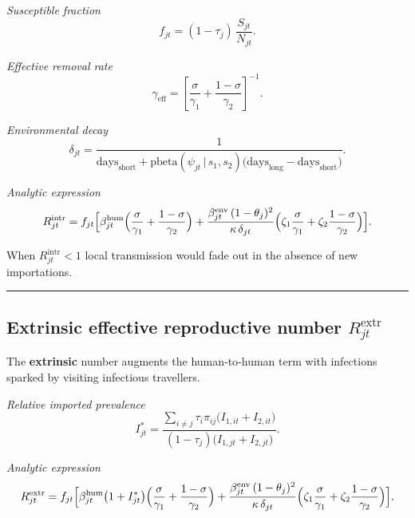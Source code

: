 \documentclass[
]{book}
\begin{document}
\emph{Susceptible fraction}
\[
f_{jt}
  = (1-\tau_j)\,
    \frac{S_{jt}}{N_{jt}} .
\]

\emph{Effective removal rate}\\
\[
\gamma_{\mathrm{eff}}
  = \left[\frac{\sigma}{\gamma_1}
          +\frac{1-\sigma}{\gamma_2}\right]^{-1}.
\]

\emph{Environmental decay}\\
\[
\delta_{jt}
  = \frac{1}{\text{days}_{\text{short}}
             +\text{pbeta}(\psi_{jt}\,|\,s_1,s_2)
              \bigl(\text{days}_{\text{long}}-\text{days}_{\text{short}}\bigr)} .
\]

\emph{Analytic expression}\\
\[
R_{jt}^{\mathrm{intr}}
  = f_{jt}\Bigl[
        \beta_{jt}^{\text{hum}}
        \Bigl(\frac{\sigma}{\gamma_1}
              +\frac{1-\sigma}{\gamma_2}\Bigr)
      + \frac{\beta_{jt}^{\text{env}}\,(1-\theta_j)^{2}}
             {\kappa\,\delta_{jt}}
        \Bigl(\zeta_1\frac{\sigma}{\gamma_1}
              +\zeta_2\frac{1-\sigma}{\gamma_2}\Bigr)
    \Bigr].
\]

When \(R_{jt}^{\mathrm{intr}}<1\) local transmission would fade out in the absence of new importations.

\begin{center}\rule{0.5\linewidth}{0.5pt}\end{center}

\subsection{\texorpdfstring{Extrinsic effective reproductive number \(R_{jt}^{\mathrm{extr}}\)}{Extrinsic effective reproductive number R\_\{jt\}\^{}\{\textbackslash mathrm\{extr\}\}}}\label{extrinsic-effective-reproductive-number-r_jtmathrmextr}

The \textbf{extrinsic} number augments the human‐to‐human term with infections sparked by visiting infectious travellers.

\emph{Relative imported prevalence}\\
\[
I^{\ast}_{jt}
  = \frac{\sum_{i\neq j}\tau_i\pi_{ij}\bigl(I_{1,it}+I_{2,it}\bigr)}
         {(1-\tau_j)\bigl(I_{1,jt}+I_{2,jt}\bigr)} .
\]

\emph{Analytic expression}\\
\[
R_{jt}^{\mathrm{extr}}
  = f_{jt}\Bigl[
        \beta_{jt}^{\text{hum}}
        \bigl(1+I^{\ast}_{jt}\bigr)
        \Bigl(\frac{\sigma}{\gamma_1}
              +\frac{1-\sigma}{\gamma_2}\Bigr)
      + \frac{\beta_{jt}^{\text{env}}\,(1-\theta_j)^{2}}
             {\kappa\,\delta_{jt}}
        \Bigl(\zeta_1\frac{\sigma}{\gamma_1}
              +\zeta_2\frac{1-\sigma}{\gamma_2}\Bigr)
    \Bigr].
\]
\end{document}
